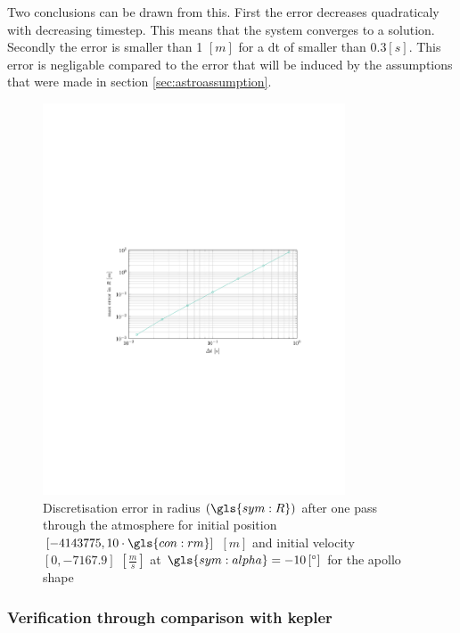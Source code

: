 Two conclusions can be drawn from this. First the error decreases quadraticaly with decreasing timestep. This means that the system converges to a solution. Secondly the error is smaller than 1 $\left[m\right]$ for a dt of smaller than $0.3 \left[s\right]$. This error is negligable compared to the error that will be induced by the assumptions that were made in section \ref{sec:astroassumption}.



\begin{figure}[h]
	\centering
	\includegraphics[trim={4.25cm 10cm 3.2cm 10cm},clip,width=0.8\textwidth]{Figure/orbital_model/dicretization.pdf}
	\caption{Discretisation error in radius $\left(\gls{sym:R}\right)$ after one pass through the atmosphere for initial position $\left[-4143775,10\cdot\gls{con:rm}\right]$ $\left[m\right]$ and initial velocity $\left[0,-7167.9\right]$ $\left[\frac{m}{s}\right]$ at $\gls{sym:alpha}=-10\left[^\circ\right]$ for the apollo shape}
	\label{fig:atmos_disc}
\end{figure}

\subsubsection{Verification through comparison with kepler}
\label{sec:astroverf}

